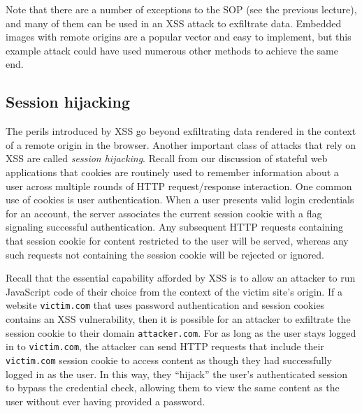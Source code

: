 \documentclass[11pt,twoside]{scrartcl}
\begin{document}
Note that there are a number of exceptions to the SOP (see the previous lecture), and many of them can be used in an XSS attack to exfiltrate data. Embedded images with remote origins are a popular vector and easy to implement, but this example attack could have used numerous other methods to achieve the same end.

\subsection{Session hijacking}
The perils introduced by XSS go beyond exfiltrating data rendered in the context of a remote origin in the browser. Another important class of attacks that rely on XSS are called \emph{session hijacking}.
Recall from our discussion of stateful web applications that cookies are routinely used to remember information about a user across multiple rounds of HTTP request/response interaction.
One common use of cookies is user authentication.
When a user presents valid login credentials for an account, the server associates the current session cookie with a flag signaling successful authentication.
Any subsequent HTTP requests containing that session cookie for content restricted to the user will be served, whereas any such requests not containing the session cookie will be rejected or ignored.

 Recall that the essential capability afforded by XSS is to allow an attacker to run JavaScript code of their choice from the context of the victim site's origin. If a website \verb'victim.com' that uses password authentication and session cookies contains an XSS vulnerability, then it is possible for an attacker to exfiltrate the session cookie to their domain \verb'attacker.com'. For as long as the user stays logged in to \verb'victim.com', the attacker can send HTTP requests that include their \verb'victim.com' session cookie to access content as though they had successfully logged in as the user. In this way, they ``hijack'' the user's authenticated session to bypass the credential check, allowing them to view the same content as the user without ever having provided a password.
\end{document}
